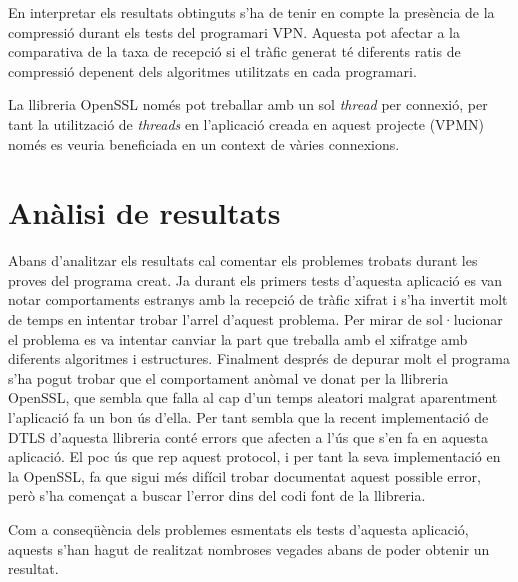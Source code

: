 En interpretar els resultats obtinguts s'ha de tenir en compte la presència de la compressió durant els tests del programari VPN. Aquesta pot afectar a la comparativa de la taxa de recepció si el tràfic generat té diferents ratis de compressió depenent dels algoritmes utilitzats en cada programari.

La llibreria OpenSSL només pot treballar amb un sol \emph{thread} per connexió, per tant la utilització de \emph{threads} en l'aplicació creada en aquest projecte (VPMN) només es veuria beneficiada en un context de vàries connexions.


\section{Anàlisi de resultats}
Abans d'analitzar els resultats cal comentar els problemes trobats durant les proves del programa creat. 
Ja durant els primers tests d'aquesta aplicació es van notar comportaments estranys amb la recepció de tràfic xifrat i s'ha invertit molt de temps en intentar trobar l'arrel d'aquest problema. Per mirar de sol·lucionar el problema es va intentar canviar la part que treballa amb el xifratge amb diferents algoritmes i estructures. Finalment després de depurar molt el programa s'ha pogut trobar que el comportament anòmal ve donat per la llibreria OpenSSL, que sembla que falla al cap d'un temps aleatori malgrat aparentment l'aplicació fa un bon ús d'ella. Per tant sembla que la recent implementació de DTLS d'aquesta llibreria conté errors que afecten a l'ús que s'en fa en aquesta aplicació.
El poc ús que rep aquest protocol, i per tant la seva implementació en la OpenSSL, fa que sigui més difícil trobar documentat aquest possible error, però s'ha començat a buscar l'error dins del codi font de la llibreria.

Com a conseqüència dels problemes esmentats els tests d'aquesta aplicació, aquests s'han hagut de realitzat nombroses vegades abans de poder obtenir un resultat.

